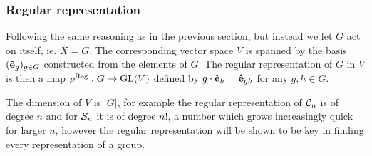 \subsubsection{Regular representation}

	Following the same reasoning as in the previous section, but instead we let $G$ act on itself, ie. $X = G$. The corresponding vector space $V$ is spanned by the basis $(\mathbf{\hat{e}}_g)_{g \in G}$ constructed from the elements of $G$. The regular representation of $G$ in $V$ is then a map	$\rho^{\text{Reg}}: G \rightarrow \text{GL}(V)$ defined by $g \cdot \mathbf{\hat{e}}_h = \mathbf{\hat{e}}_{gh}$ for any $g,h \in G$.%
	
	The dimension of $V$ is $|G|$, for example the regular representation of $\mathcal{C}_n$ is of degree $n$ and for $\mathcal{S}_n$ it is of degree $n!$, a number which grows increasingly quick for larger $n$, however the regular representation will be shown to be key in finding every representation of a group.
